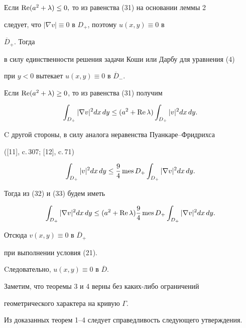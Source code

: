 Если $\operatorname{Re}(a^2+\lambda )\le 0,$ то из равенства (31) на основании леммы 2


следует, что $|\nabla v|\equiv 0$ в $D_+$, поэтому $u(x,y)\equiv 0$ в 


$\overline D_+$. Тогда 


в силу единственности решения задачи Коши или Дарбу для уравнения (4)


при $y<0$ вытекает $u(x,y)\equiv 0$ в $\overline D_-$.





Если $\operatorname{Re}(a^2+\lambda )\ge 0$, то из равенства (31) получим


\begin{equation}


\int_{D_+}|\nabla v|^2dx\,dy\le


(a^2+\re \lambda )\int_{D_+}|v|^2dx\,dy.


\end{equation}


C другой стороны, в силу аналога неравенства Пуанкаре--Фридрихса


([11], c.\,307; [12], c.\,71)


\begin{equation}


\int_{D_+} |v|^2dx\,dy\le 


\frac {9}{4}\mes D_+\int_{D_+} |\nabla v|^2dx\,dy.


\end{equation}


Тогда из (32) и (33) будем иметь


$$


\int_{D_+}|\nabla v|^2dx\,dy\le


(a^2+\re \lambda )\frac {9}{4}\mes D_+\int_{D_+} |\nabla v|^2dx\,dy.


$$


Отсюда $v(x,y)\equiv 0$ в $\overline D_+$ 


при выполнении условия (21).


Cледовательно, $u(x,y)\equiv 0$ в $\overline D$. 





Заметим, что теоремы 3 и 4 верны без каких-либо ограничений 


геометрического характера на кривую $\Gamma$. 


Из доказанных теорем 1--4 следует справедливость следующего утверждения.






